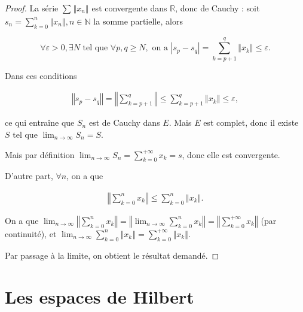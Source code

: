 \documentclass[french]{book}
\theoremstyle{definition}
\newcommand{\bg}{>}
\begin{document}
\begin{proof}
  La série \(\displaystyle\sum_{}^{} \left\Vert x_n \right\Vert  \) est convergente dans \(\mathbb{R}\), donc de Cauchy : soit \(s_n = \displaystyle\sum_{k=0}^{n} \left\Vert x_n \right\Vert, n \in \mathbb{N}\) la somme partielle, alors

  \[\forall \varepsilon \bg 0, \exists N \text{ tel que } \forall p,q \geq  N, \text{  on a } \left\lvert s_p - s_q \right\rvert  = \displaystyle\sum_{k=p+1}^{q}\left\Vert x_k \right\Vert \leq \varepsilon. \]

  Dans ces conditions

  \begin{gather*}
    \left\Vert s_p - s_q \right\Vert = \left\Vert \displaystyle\sum_{k=p+1}^{q}   \right\Vert \leq \displaystyle\sum_{k=p+1}^{q} \left\Vert x_k \right\Vert  \leq  \varepsilon,
  \end{gather*}

  ce qui entraîne que \(S_n\) est de Cauchy dans \(E\). Mais \(E\) est complet, donc il existe \(S\) tel que \(\lim_{n \to \infty} S_n = S\).

  Mais par définition \(\lim_{n \to \infty} S_n = \displaystyle\sum_{k=0}^{+\infty} x_k = s \), donc elle est convergente.

  D'autre part, \(\forall n\), on a que

  \begin{gather*}
    \left\Vert \displaystyle\sum_{k=0}^{n} x_k  \right\Vert \leq  \displaystyle\sum_{k=0}^{n} \left\Vert x_k \right\Vert.
  \end{gather*}

  On a que \(\lim_{n \to \infty} \left\Vert \displaystyle\sum_{k=0}^{n}x_k  \right\Vert  = \left\Vert \lim_{n \to \infty} \displaystyle\sum_{k=0}^{n} x_k  \right\Vert = \left\Vert \displaystyle\sum_{k=0}^{+\infty} x_k  \right\Vert  \) (par continuité),
  et \(\lim_{n \to \infty} \displaystyle\sum_{k=0}^{n} \left\Vert x_k \right\Vert = \displaystyle\sum_{k=0}^{+\infty} \left\Vert x_k \right\Vert   \).

  Par passage à la limite, on obtient le résultat demandé.
\end{proof}

\section{Les espaces de Hilbert}
\end{document}
